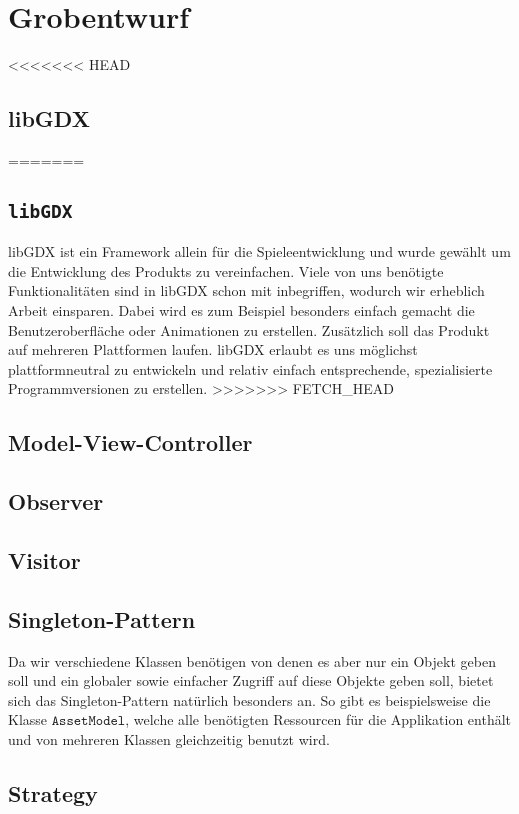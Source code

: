 \section{Grobentwurf}

<<<<<<< HEAD
\subsection{libGDX}
=======
\subsection{\texttt{libGDX}}
libGDX ist ein Framework allein für die Spieleentwicklung und wurde gewählt um die Entwicklung des Produkts zu vereinfachen.
Viele von uns benötigte Funktionalitäten sind in libGDX schon mit inbegriffen, wodurch wir erheblich Arbeit einsparen.
Dabei wird es zum Beispiel besonders einfach gemacht die Benutzeroberfläche oder Animationen zu erstellen.
Zusätzlich soll das Produkt auf mehreren Plattformen laufen. libGDX erlaubt es uns möglichst plattformneutral zu entwickeln 
und relativ einfach entsprechende, spezialisierte Programmversionen zu erstellen.
>>>>>>> FETCH_HEAD

\subsection{Model-View-Controller}

\subsection{Observer}

\subsection{Visitor}

\subsection{Singleton-Pattern}
Da wir verschiedene Klassen benötigen von denen es aber nur ein Objekt geben soll und ein globaler sowie einfacher Zugriff auf diese Objekte geben soll, bietet sich das Singleton-Pattern natürlich besonders an. So gibt es beispielsweise die Klasse $\texttt{AssetModel}$, welche alle benötigten Ressourcen für die Applikation enthält und von mehreren Klassen gleichzeitig benutzt wird.

\subsection{Strategy}
